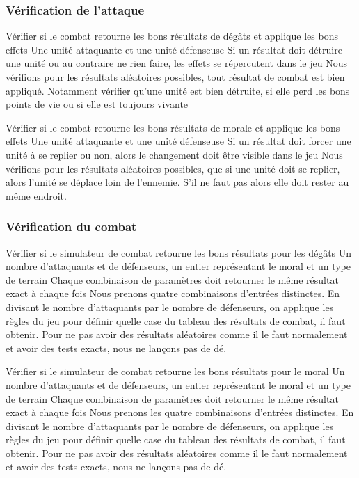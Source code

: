 \subsubsection{Vérification de l'attaque}

\mytest
{Vérifier si le combat retourne les bons résultats de dégâts et applique les bons effets}
{Une unité attaquante et une unité défenseuse}
{Si un résultat doit détruire une unité ou au contraire ne rien faire, les effets se répercutent dans le jeu}
{Nous vérifions pour les résultats aléatoires possibles, tout résultat de combat est bien appliqué. Notamment vérifier
    qu'une unité est bien détruite, si elle perd les bons points de vie ou si elle est toujours vivante}

\mytest
{Vérifier si le combat retourne les bons résultats de morale et applique les bons effets}
{Une unité attaquante et une unité défenseuse}
{Si un résultat doit forcer une unité à se replier ou non, alors le changement doit être visible dans le jeu}
{Nous vérifions pour les résultats aléatoires possibles, que si une unité doit se replier, alors l'unité se
    déplace loin de l'ennemie. S'il ne faut pas alors elle doit rester au même endroit.}

\subsubsection{Vérification du combat}

\mytest
{Vérifier si le simulateur de combat retourne les bons résultats pour les dégâts}
{Un nombre d'attaquants et de défenseurs, un entier représentant le moral et un type de terrain}
{Chaque combinaison de paramètres doit retourner le même résultat exact à chaque fois}
{Nous prenons quatre combinaisons d'entrées distinctes.
    En divisant le nombre d'attaquants par le nombre de défenseurs, on applique les règles du jeu pour définir
    quelle case du tableau des résultats de combat, il faut obtenir. Pour ne pas avoir des résultats aléatoires comme
    il le faut normalement et avoir des tests exacts, nous ne lançons pas de dé.}

\mytest
{Vérifier si le simulateur de combat retourne les bons résultats pour le moral}
{Un nombre d'attaquants et de défenseurs, un entier représentant le moral et un type de terrain}
{Chaque combinaison de paramètres doit retourner le même résultat exact à chaque fois}
{Nous prenons les quatre combinaisons d'entrées distinctes.
    En divisant le nombre d'attaquants par le nombre de défenseurs, on applique les règles du jeu pour définir
    quelle case du tableau des résultats de combat, il faut obtenir. Pour ne pas avoir des résultats aléatoires comme
    il le faut normalement et avoir des tests exacts, nous ne lançons pas de dé.}


